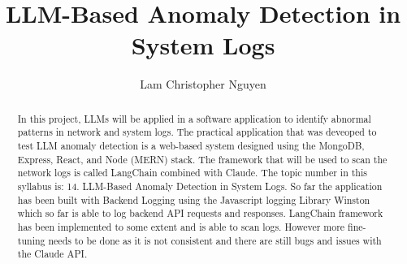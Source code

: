 \documentclass[sigconf]{acmart}
\begin{document}
\title{LLM-Based Anomaly Detection in System Logs}

\author{Lam Christopher Nguyen}


\renewcommand{\shortauthors}{Nguyen}

\begin{abstract}

In this project, LLMs will be applied in a software application to identify abnormal patterns in network and system logs. The practical application that was deveoped to test LLM anomaly detection is a web-based system designed using the MongoDB, Express, React, and Node (MERN) stack. The framework that will be used to scan the network logs is called LangChain combined with Claude. The topic number in this syllabus is: 14. LLM-Based Anomaly Detection in System Logs. So far the application has been built with Backend Logging using the Javascript logging Library Winston which so far is able to log backend API requests and responses. LangChain framework has been implemented to some extent and is able to scan logs. However more fine-tuning needs to be done as it is not consistent and there are still bugs and issues with the Claude API.
\end{abstract}
\end{document}
